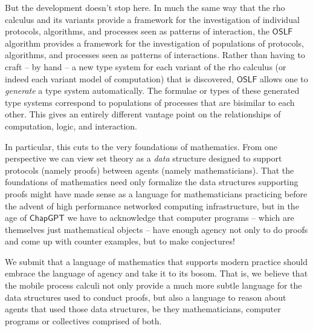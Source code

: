 But the development doesn't stop here. In much the same way that the
rho calculus and its variants provide a framework for the
investigation of individual protocols, algorithms, and processes seen
as patterns of interaction, the $\mathsf{OSLF}$ algorithm provides a
framework for the investigation of populations of protocols,
algorithms, and processes seen as patterns of interactions. Rather
than having to craft -- by hand -- a new type system for each variant
of the rho calculus (or indeed each variant model of computation) that
is discovered, $\mathsf{OSLF}$ allows one to \emph{generate} a type
system automatically. The formulae or types of these generated type
systems correspond to populations of processes that are bisimilar to
each other. This gives an entirely different vantage point on the
relationships of computation, logic, and interaction.

In particular, this cuts to the very foundations of mathematics. From
one perspective we can view set theory as a \emph{data} structure
designed to support protocols (namely proofs) between agents (namely
mathematicians). That the foundations of mathematics need only
formalize the data structures supporting proofs might have made sense
as a language for mathematicians practicing before the advent of high
performance networked computing infrastructure, but in the age of
$\mathsf{ChapGPT}$ we have to acknowledge that computer programs --
which are themselves just mathematical objects -- have enough agency
not only to do proofs and come up with counter examples, but to make
conjectures!

We submit that a language of mathematics that supports modern practice
should embrace the language of agency and take it to its bosom. That
is, we believe that the mobile process calculi not only provide a much
more subtle language for the data structures used to conduct proofs,
but also a language to reason about agents that used those data
structures, be they mathematicians, computer programs or collectives
comprised of both.



